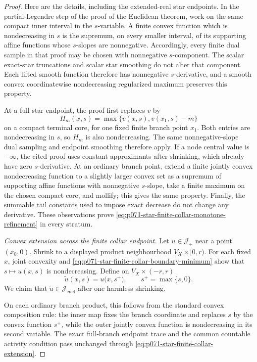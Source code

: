 \begin{proof}
Here are the details, including the extended-real star endpoints.  In the
partial-Legendre step of the proof of the Euclidean theorem, work on the
same compact inner interval in the $s$-variable.  A finite convex function
which is nondecreasing in $s$ is the supremum, on every smaller interval,
of its supporting affine functions whose $s$-slopes are nonnegative.
Accordingly, every finite dual sample in that proof may be chosen with
nonnegative $s$-component.  The scalar exact-star truncations and scalar
star smoothing do not alter that component.  Each lifted smooth function
therefore has nonnegative $s$-derivative, and a smooth convex
coordinatewise nondecreasing regularized maximum preserves this property.

At a full star endpoint, the proof first replaces $v$ by
\[
                 H_m(x,s)=\max\{v(x,s),v(x_1,s)-m\}
\]
on a compact terminal core, for one fixed finite branch point $x_1$.
Both entries are nondecreasing in $s$, so $H_m$ is also nondecreasing.
The same nonnegative-slope dual sampling and endpoint smoothing therefore
apply.  If a node central value is $-\infty$, the cited proof uses constant
approximants after shrinking, which already have zero $s$-derivative.  At
an ordinary branch point, extend a finite jointly convex nondecreasing
function to a slightly larger convex set as a supremum of supporting
affine functions with nonnegative $s$-slope, take a finite maximum on the
chosen compact core, and mollify; this gives the same property.  Finally,
the summable tail constants used to impose exact decrease do not change any
derivative.  These observations prove
\eqref{eq:p071-star-finite-collar-monotone-refinement} in every stratum.

\medskip\noindent
\emph{Convex extension across the finite collar endpoint.}
Let $u\in\mathcal J_+$ near a point $(x_0,0)$.  Shrink to a displayed
product neighbourhood $V_X\times[0,r)$.  For each fixed $x$, joint
convexity and
\eqref{eq:p071-star-finite-collar-boundary-minimum} show that
$s\mapsto u(x,s)$ is nondecreasing.  Define on
$V_X\times(-r,r)$
\begin{equation}
             \widetilde u(x,s)=u\bigl(x,s^+\bigr),
             \qquad s^+=\max\{s,0\}.
\label{eq:p071-star-finite-collar-extension}
\end{equation}
We claim that $\widetilde u\in\mathcal J_{\mathrm{eucl}}$ after one
harmless shrinking.

On each ordinary branch product, this follows from the standard convex
composition rule: the inner map fixes the branch coordinate and replaces
$s$ by the convex function $s^+$, while the outer jointly convex function
is nondecreasing in its second variable.  The exact full-branch endpoint
trace and the common countable activity condition pass unchanged through
\eqref{eq:p071-star-finite-collar-extension}.


\end{proof}
